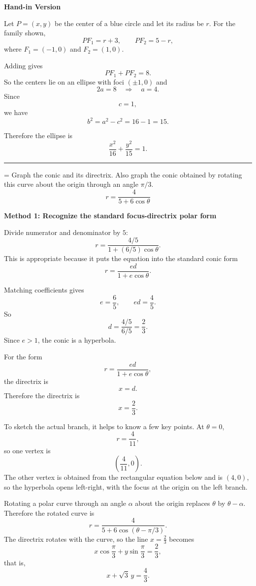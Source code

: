 \documentclass[a4paper,12pt,twocolumn]{article}
\newlength{\problemnumberwidth}
\newenvironment{solutionbox}{\begin{framed}}{\end{framed}}
\newcommand{\sectiontitle}[2]{%
  \hypertarget{#1}{}%
  \par\vspace{0.8em}%
  \noindent{\Large\bfseries #2}\par
  \vspace{0.3em}%
  \hrule
  \vspace{0.8em}%
}
\newcommand{\problem}[3]{%
  \Needspace{10\baselineskip}%
  \phantomsection\label{#1}%
  \par\vspace{0.8em}%
  \noindent
  \hangindent=\problemnumberwidth
  \hangafter=1
  \makebox[\problemnumberwidth][l]{\textbf{#2.}}#3\par
}
\begin{document}
\begin{solutionbox}
\textbf{Hand-in Version}

Let \(P=(x,y)\) be the center of a blue circle and let its radius be \(r\). For the family shown,
\[
PF_1=r+3,\qquad PF_2=5-r,
\]
where \(F_1=(-1,0)\) and \(F_2=(1,0)\).

Adding gives
\[
PF_1+PF_2=8.
\]
So the centers lie on an ellipse with foci \((\pm1,0)\) and
\[
2a=8 \quad\Longrightarrow\quad a=4.
\]
Since
\[
c=1,
\]
we have
\[
b^2=a^2-c^2=16-1=15.
\]

Therefore the ellipse is
\[
\boxed{\frac{x^2}{16}+\frac{y^2}{15}=1.}
\]
\end{solutionbox}

\sectiontitle{sec:10-6}{10-6}

\problem{prob:10-6-24}{24}{Graph the conic and its directrix. Also graph the conic obtained by rotating this curve about the origin through an angle \(\pi/3\).
\[
r=\frac{4}{5+6\cos\theta}
\]}

\begin{solutionbox}
\textbf{Method 1: Recognize the standard focus-directrix polar form}

\begin{steps}
\item Divide numerator and denominator by \(5\):
\[
r=\frac{4/5}{1+(6/5)\cos\theta}.
\]
This is appropriate because it puts the equation into the standard conic form
\[
r=\frac{ed}{1+e\cos\theta}.
\]

\item Matching coefficients gives
\[
e=\frac65,
\qquad
ed=\frac45.
\]
So
\[
d=\frac{4/5}{6/5}=\frac23.
\]
Since \(e>1\), the conic is a hyperbola.

\item For the form
\[
r=\frac{ed}{1+e\cos\theta},
\]
the directrix is
\[
x=d.
\]
Therefore the directrix is
\[
\boxed{x=\frac23.}
\]

\item To sketch the actual branch, it helps to know a few key points. At \(\theta=0\),
\[
r=\frac{4}{11},
\]
so one vertex is
\[
\left(\frac{4}{11},0\right).
\]
The other vertex is obtained from the rectangular equation below and is \((4,0)\), so the hyperbola opens left-right, with the focus at the origin on the left branch.

\item Rotating a polar curve through an angle \(\alpha\) about the origin replaces \(\theta\) by \(\theta-\alpha\). Therefore the rotated curve is
\[
\boxed{r=\frac{4}{5+6\cos(\theta-\pi/3)}.}
\]
The directrix rotates with the curve, so the line \(x=\frac23\) becomes
\[
x\cos\frac{\pi}{3}+y\sin\frac{\pi}{3}=\frac23,
\]
that is,
\[
\boxed{x+\sqrt3\,y=\frac43.}
\]
\end{steps}
\end{solutionbox}
\end{document}
